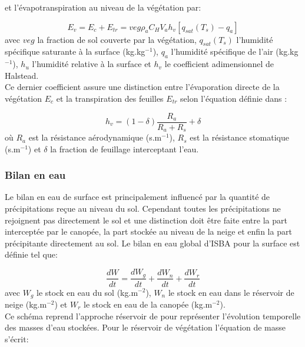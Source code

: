\noindent et l'évapotranspiration au niveau de la végétation par:

\begin{equation}
\label{eq_etr_3L}
E_{v} = E_{c} + E_{tr}=veg\rho_{a}C_{H}V_{a}h_{v}[q_{sat}(T_{s})-q_{a}]
\end{equation}
avec $veg$ la fraction de sol couverte par la végétation, $q_{sat}(T_{s})$ l'humidité spécifique saturante à la surface (kg.kg$^{-1}$), $q_{a}$ l'humidité spécifique de l'air (kg.kg$^{-1}$), $h_{u}$ l'humidité relative à la surface et $h_{v}$ le coefficient adimensionnel de Halstead. \\

\noindent Ce dernier coefficient assure une distinction entre l'évaporation directe de la végétation $E_{c}$ et la transpiration des feuilles $E_{tr}$ selon l'équation définie dans \citet{noilhan1989}:

\begin{equation}
h_{v} = (1- \delta)\frac{R_{a}}{R_{a}+R_{s}}+\delta
\end{equation}
où $R_{a}$ est la résistance aérodynamique (s.m$^{-1}$), $R_{s}$ est la résistance stomatique (s.m$^{-1}$) et $\delta$ la fraction de feuillage interceptant l'eau. \\


\subsubsection{{\selectfont Bilan en eau}}

Le bilan en eau de surface est principalement influencé par la quantité de précipitations reçue au niveau du sol. Cependant toutes les précipitations ne rejoignent pas directement le sol et une distinction doit être faite entre la part interceptée par le canopée, la part stockée au niveau de la neige et enfin la part précipitante directement au sol. Le bilan en eau global d'ISBA pour la surface est définie tel que:

\begin{equation} \label{bilan_eau_3L}
\frac{dW}{dt} = \frac{dW_{g}}{dt} + \frac{dW_{n}}{dt} + \frac{dW_{r}}{dt}
\end{equation}
avec $W_{g}$ le stock en eau du sol (kg.m$^{-2}$), $W_{n}$ le stock en eau dans le réservoir de neige (kg.m$^{-2}$) et $W_{r}$ le stock en eau de la canopée (kg.m$^{-2}$).\\

\noindent Ce schéma reprend l'approche réservoir de \citet{deardorff1978} pour représenter l'évolution temporelle des masses d'eau stockées. Pour le réservoir de végétation l'équation de masse s'écrit:


